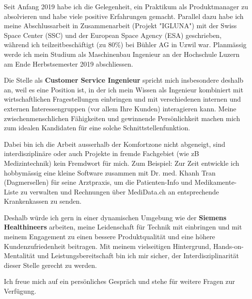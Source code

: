 \documentclass[11pt, a4paper]{awesome-cv}
\newcommand{\companyName}{Siemens Healthineers }
\newcommand{\jobPosition}{Customer Service Ingenieur}
\begin{document}
\makecvheader

\makelettertitle

\begin{cvletter}
	
Seit Anfang 2019 habe ich die Gelegenheit, ein Praktikum als Produktmanager zu absolvieren und habe viele positive Erfahrungen gemacht. Parallel dazu habe ich meine Abschlussarbeit in Zusammenarbeit (Projekt "IGLUNA") mit der Swiss Space Center (SSC) und der European Space Agency (ESA) geschrieben, während ich teilzeitbeschäftigt (zu 80\%) bei Bühler AG in Uzwil war. Planmässig werde ich mein Studium als Maschinenbau Ingenieur an der Hochschule Luzern am Ende Herbstsemester 2019 abschliessen.	


Die Stelle als \textbf{\jobPosition} spricht mich insbesondere deshalb an, weil es eine Position ist, in der ich mein Wissen als Ingenieur kombiniert mit wirtschaftlichen Fragestellungen einbringen und mit verschiedenen internen und externen Interessengruppen (vor allem Ihre Kunden) interagieren kann. Meine zwischenmenschlichen Fähigkeiten und gewinnende Persönlichkeit machen mich zum idealen Kandidaten für eine solche Schnittstellenfunktion.
 
Dabei bin ich die Arbeit ausserhalb der Komfortzone nicht abgeneigt, sind interdisziplinäre oder auch Projekte in fremde Fachgebiet (wie zB Medizintechnik) kein Fremdwort für mich. Zum Beispiel: Zur Zeit entwickle ich hobbymässig eine kleine Software zusammen mit Dr. med. Khanh Tran (Dagmersellen) für seine Arztpraxis, um die Patienten-Info und Medikamente-Liste zu verwalten und Rechnungen über MediData.ch an entsprechende Krankenkassen zu senden. 

Deshalb würde ich gern in einer dynamischen Umgebung wie der \textbf{\companyName} arbeiten, meine Leidenschaft für Technik mit einbringen und mit meinem Engagement zu einen bessere Produktqualität und eine höhere Kundenzufriedenheit beitragen. Mit meinem vielseitigen Hintergrund, Hands-on-Mentalität und Leistungsbereitschaft bin ich mir sicher, der Interdisziplinarität dieser Stelle gerecht zu werden. 

Ich freue mich auf ein persönliches Gespräch und stehe für weitere Fragen zur Verfügung.

\end{cvletter}

\makeletterclosing
\end{document}
